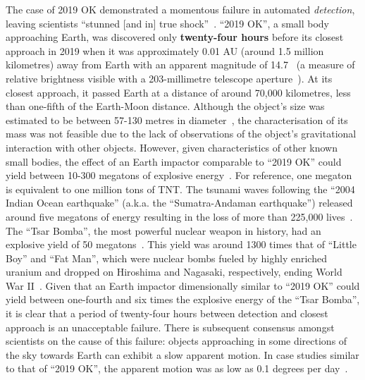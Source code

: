 The case of 2019 OK demonstrated a momentous failure in automated \textit{detection}, leaving scientists ``stunned [and in] true shock''~\cite{chiu_2019}. ``2019 OK'', a small body approaching Earth, was discovered only \textbf{twenty-four hours} before its closest approach in 2019 when it was approximately 0.01 AU (around 1.5 million kilometres) away from Earth with an apparent magnitude of 14.7~\cite{IAU2019OK} (a measure of relative brightness visible with a 203-millimetre telescope aperture~\cite[p.~24]{North2014}). At its closest approach, it passed Earth at a distance of around 70,000 kilometres, less than one-fifth of the Earth-Moon distance. Although the object's size was estimated to be between 57-130 metres in diameter~\cite{NASA2019}, the characterisation of its mass was not feasible due to the lack of observations of the object's gravitational interaction with other objects. However, given characteristics of other known small bodies, the effect of an Earth impactor comparable to ``2019 OK'' could yield between 10-300 megatons of explosive energy~\cite{Cellino1999, Rumpf2017}. For reference, one megaton is equivalent to one million tons of TNT. The tsunami waves following the ``2004 Indian Ocean earthquake'' (a.k.a. the ``Sumatra-Andaman earthquake'') released around five megatons of energy resulting in the loss of more than 225,000 lives~\cite{Nirupama2006}. The ``Tsar Bomba'', the most powerful nuclear weapon in history, had an explosive yield of 50 megatons~\cite{Khan2020}. This yield was around 1300 times that of ``Little Boy'' and ``Fat Man'', which were nuclear bombs fueled by highly enriched uranium and dropped on Hiroshima and Nagasaki, respectively, ending World War II~\cite{osti_1489669}. Given that an Earth impactor dimensionally similar to ``2019 OK'' could yield between one-fourth and six times the explosive energy of the ``Tsar Bomba'', it is clear that a period of twenty-four hours between detection and closest approach is an unacceptable failure. There is subsequent consensus amongst scientists on the cause of this failure: objects approaching in some directions of the sky towards Earth can exhibit a slow apparent motion. In case studies similar to that of ``2019 OK'', the apparent motion was as low as 0.1 degrees per day~\cite{Wainscoat2022}. 

